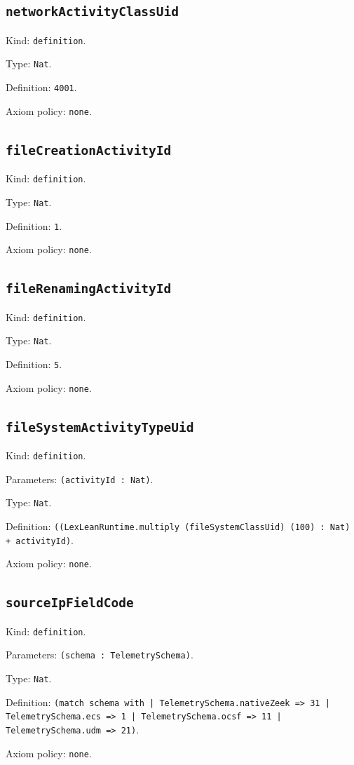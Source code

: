 \documentclass[11pt]{article}
\begin{document}
\subsection*{\texttt{networkActivityClassUid}}
\noindent Kind: \texttt{definition}.\par
\noindent Type: \texttt{Nat}.\par
\noindent Definition: \texttt{4001}.\par
\noindent Axiom policy: \texttt{none}.\par
\subsection*{\texttt{fileCreationActivityId}}
\noindent Kind: \texttt{definition}.\par
\noindent Type: \texttt{Nat}.\par
\noindent Definition: \texttt{1}.\par
\noindent Axiom policy: \texttt{none}.\par
\subsection*{\texttt{fileRenamingActivityId}}
\noindent Kind: \texttt{definition}.\par
\noindent Type: \texttt{Nat}.\par
\noindent Definition: \texttt{5}.\par
\noindent Axiom policy: \texttt{none}.\par
\subsection*{\texttt{fileSystemActivityTypeUid}}
\noindent Kind: \texttt{definition}.\par
\noindent Parameters: \texttt{(activityId : Nat)}.\par
\noindent Type: \texttt{Nat}.\par
\noindent Definition: \texttt{((LexLeanRuntime.multiply (fileSystemClassUid) (100) : Nat) + activityId)}.\par
\noindent Axiom policy: \texttt{none}.\par
\subsection*{\texttt{sourceIpFieldCode}}
\noindent Kind: \texttt{definition}.\par
\noindent Parameters: \texttt{(schema : TelemetrySchema)}.\par
\noindent Type: \texttt{Nat}.\par
\noindent Definition: \texttt{(match schema with | TelemetrySchema.nativeZeek => 31 | TelemetrySchema.ecs => 1 | TelemetrySchema.ocsf => 11 | TelemetrySchema.udm => 21)}.\par
\noindent Axiom policy: \texttt{none}.\par
\end{document}
